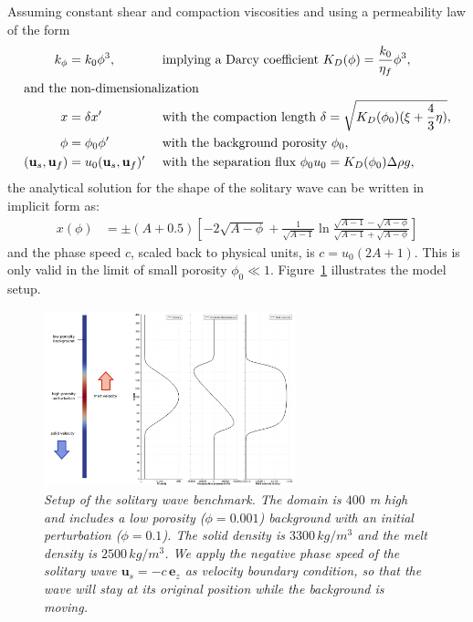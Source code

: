\documentclass{article}
\begin{document}
Assuming constant shear and compaction viscosities and using a permeability law of the form
%
\begin{align*}
k_\phi &= k_0 \phi^3, && \text{ implying a Darcy coefficient }
K_D(\phi) = \frac{k_0}{\eta_f} \phi^3 , \\
\intertext{and the non-dimensionalization }
x &= \delta x' 
  && \text{ with the compaction length } \delta = \sqrt{K_D(\phi_0)(\xi + \frac{4}{3}\eta)} , \\
\phi &= \phi_0 \phi ' 
  && \text{ with the background porosity } \phi_0 , \\
(\mathbf u_s, \mathbf u_f) &= u_0 (\mathbf u_s, \mathbf u_f)' 
  && \text{ with the separation flux } \phi_0 u_0 = K_D(\phi_0) \Delta\rho g ,
\end{align*}
%
the analytical solution for the shape of the solitary wave can be written in implicit form as:
\begin{align*}
x(\phi) &= \pm (A + 0.5) 
\left[ -2 \sqrt{A-\phi} + \frac{1}{\sqrt{A-1}} 
\ln \frac{\sqrt{A-1} - \sqrt{A-\phi}}{\sqrt{A-1} + \sqrt{A-\phi}} \right]
\end{align*}
and the phase speed $c$, scaled back to physical units, is $c = u_0 (2A+1)$. 
This is only valid in the limit of small porosity $\phi_0 \ll 1$. Figure~\ref{fig:setup-solitary-wave} illustrates the model setup. 

\begin{figure}
  \begin{center}
    \includegraphics[width=0.65\textwidth]{cookbooks/benchmarks/solitary_wave/setup.pdf}
  \end{center}
  \caption{\it Setup of the solitary wave benchmark. The domain is $400$ m high and includes a low porosity
  ($\phi = 0.001$) background with an initial perturbation ($\phi = 0.1$). The solid density is $3300\,kg/m^3$
  and the melt density is $2500\,kg/m^3$. We apply the negative phase speed 
  of the solitary wave $\mathbf u_s = -c \, \mathbf e_z$ as velocity boundary condition, so that the wave will 
  stay at its original position while the background is moving.}
  \label{fig:setup-solitary-wave}
\end{figure}
\end{document}
